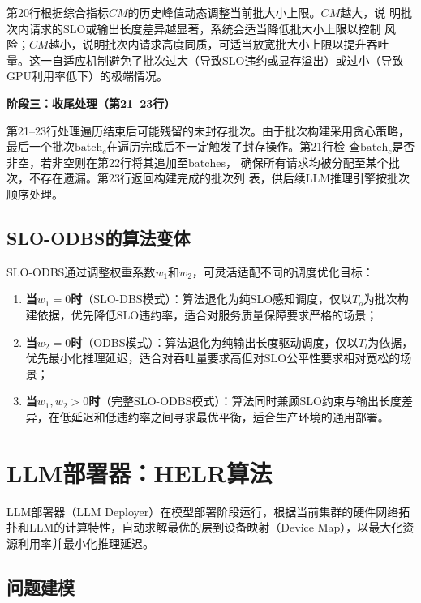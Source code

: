 第20行根据综合指标$CM$的历史峰值动态调整当前批大小上限。$CM$越大，说
明批次内请求的SLO或输出长度差异越显著，系统会适当降低批大小上限以控制
风险；$CM$越小，说明批次内请求高度同质，可适当放宽批大小上限以提升吞吐
量。这一自适应机制避免了批次过大（导致SLO违约或显存溢出）或过小（导致
GPU利用率低下）的极端情况。

\textbf{阶段三：收尾处理（第21--23行）}

第21--23行处理遍历结束后可能残留的未封存批次。由于批次构建采用贪心策略，
最后一个批次$\text{batch}_c$在遍历完成后不一定触发了封存操作。第21行检
查$\text{batch}_c$是否非空，若非空则在第22行将其追加至$\text{batches}$，
确保所有请求均被分配至某个批次，不存在遗漏。第23行返回构建完成的批次列
表，供后续LLM推理引擎按批次顺序处理。

\subsection{SLO-ODBS的算法变体}

SLO-ODBS通过调整权重系数$w_1$和$w_2$，可灵活适配不同的调度优化目标：
\begin{enumerate}
    \item \textbf{当$w_1 = 0$时}（SLO-DBS模式）：算法退化为纯SLO感知调度，仅以$T_o$为批次构建依据，优先降低SLO违约率，适合对服务质量保障要求严格的场景；
    \item \textbf{当$w_2 = 0$时}（ODBS模式）：算法退化为纯输出长度驱动调度，仅以$T_l$为依据，优先最小化推理延迟，适合对吞吐量要求高但对SLO公平性要求相对宽松的场景；
    \item \textbf{当$w_1, w_2 > 0$时}（完整SLO-ODBS模式）：算法同时兼顾SLO约束与输出长度差异，在低延迟和低违约率之间寻求最优平衡，适合生产环境的通用部署。
\end{enumerate}

\section{LLM部署器：HELR算法}
\label{sec:uellm_deployer}

LLM部署器（LLM Deployer）在模型部署阶段运行，根据当前集群的硬件网络拓扑和LLM的计算特性，自动求解最优的层到设备映射（Device Map），以最大化资源利用率并最小化推理延迟。

\subsection{问题建模}

